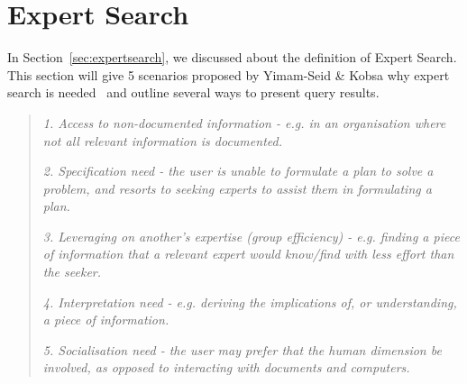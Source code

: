 \section{Expert Search}\label{sec:background_expertsearch}
In Section~\ref{sec:expertsearch}, we discussed about the definition of Expert Search. This section will give 5 scenarios proposed by Yimam-Seid \& Kobsa
why expert search is needed~\cite[P. 387]{expertsearch} and outline several ways to present query results.
\begin{quotation}
  \item \textit{1. Access to non-documented information - e.g. in an organisation where not all relevant information is documented.}
  \item \textit{2. Specification need - the user is unable to formulate a plan to solve a problem, and resorts to seeking experts to assist them in formulating a plan.}
  \item \textit{3. Leveraging on another's expertise (group efficiency) - e.g. finding a piece of information that a relevant expert would know/find with
  less effort than the seeker.}
  \item \textit{4. Interpretation need - e.g. deriving the implications of, or understanding, a piece of information.}
  \item \textit{5. Socialisation need - the user may prefer that the human dimension be involved, as opposed to interacting with documents and computers.}
\end{quotation}

